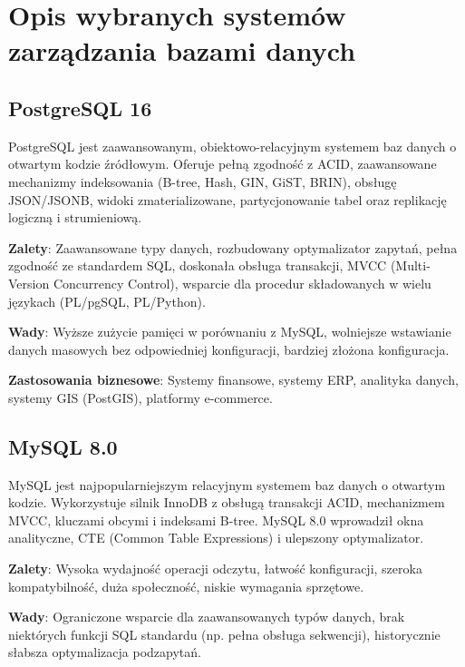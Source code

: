 \documentclass[12pt,a4paper]{article}
\begin{document}
\section{Opis wybranych systemów zarządzania bazami danych}

\subsection{PostgreSQL 16}

PostgreSQL jest zaawansowanym, obiektowo-relacyjnym systemem baz danych o otwartym kodzie źródłowym. Oferuje pełną zgodność z ACID, zaawansowane mechanizmy indeksowania (B-tree, Hash, GIN, GiST, BRIN), obsługę JSON/JSONB, widoki zmaterializowane, partycjonowanie tabel oraz replikację logiczną i strumieniową.

\textbf{Zalety}: Zaawansowane typy danych, rozbudowany optymalizator zapytań, pełna zgodność ze standardem SQL, doskonała obsługa transakcji, MVCC (Multi-Version Concurrency Control), wsparcie dla procedur składowanych w wielu językach (PL/pgSQL, PL/Python).

\textbf{Wady}: Wyższe zużycie pamięci w porównaniu z MySQL, wolniejsze wstawianie danych masowych bez odpowiedniej konfiguracji, bardziej złożona konfiguracja.

\textbf{Zastosowania biznesowe}: Systemy finansowe, systemy ERP, analityka danych, systemy GIS (PostGIS), platformy e-commerce.

\subsection{MySQL 8.0}

MySQL jest najpopularniejszym relacyjnym systemem baz danych o otwartym kodzie. Wykorzystuje silnik InnoDB z obsługą transakcji ACID, mechanizmem MVCC, kluczami obcymi i indeksami B-tree. MySQL 8.0 wprowadził okna analityczne, CTE (Common Table Expressions) i ulepszony optymalizator.

\textbf{Zalety}: Wysoka wydajność operacji odczytu, łatwość konfiguracji, szeroka kompatybilność, duża społeczność, niskie wymagania sprzętowe.

\textbf{Wady}: Ograniczone wsparcie dla zaawansowanych typów danych, brak niektórych funkcji SQL standardu (np. pełna obsługa sekwencji), historycznie słabsza optymalizacja podzapytań.
\end{document}

